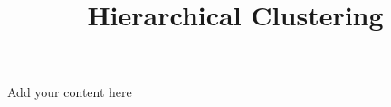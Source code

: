 \title{Hierarchical Clustering}
\label{chp:hierarchical-clustering}
\author{}
\institute{}
\maketitle



Add your content here




